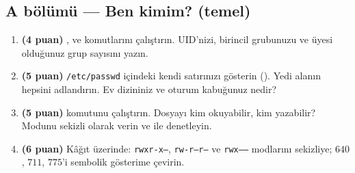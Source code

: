 \subsection*{A bölümü --- Ben kimim? (temel)}
\begin{enumerate}[leftmargin=1.8em,label=\textbf{\arabic*.}]
  \item \textbf{(4 puan)} ,  ve  komutlarını çalıştırın. UID'nizi, birincil grubunuzu ve üyesi olduğunuz grup sayısını yazın.
  \item \textbf{(5 puan)} \texttt{/etc/passwd} içindeki kendi satırınızı gösterin (). Yedi alanın hepsini adlandırın. Ev dizininiz ve oturum kabuğunuz nedir?
  \item \textbf{(5 puan)}  komutunu çalıştırın. Dosyayı kim okuyabilir, kim yazabilir? Modunu sekizli olarak verin ve  ile denetleyin.
  \item \textbf{(6 puan)} Kâğıt üzerinde: \texttt{rwxr-x---}, \texttt{rw-r--r--} ve \texttt{rwx------} modlarını sekizliye; $640$, $711$, $775$'i sembolik gösterime çevirin.
\end{enumerate}

